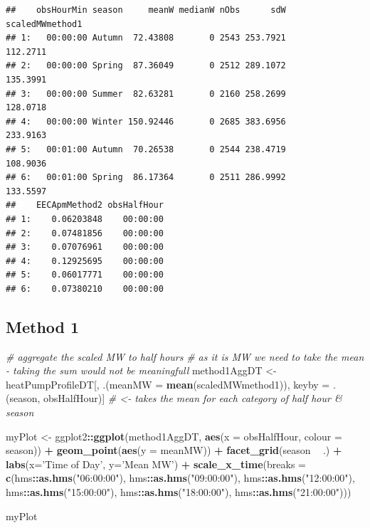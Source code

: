 \documentclass[]{article}
\newenvironment{Shaded}{\begin{snugshade}}{\end{snugshade}}
\newcommand{\KeywordTok}[1]{\textcolor[rgb]{0.13,0.29,0.53}{\textbf{#1}}}
\newcommand{\DataTypeTok}[1]{\textcolor[rgb]{0.13,0.29,0.53}{#1}}
\newcommand{\StringTok}[1]{\textcolor[rgb]{0.31,0.60,0.02}{#1}}
\newcommand{\CommentTok}[1]{\textcolor[rgb]{0.56,0.35,0.01}{\textit{#1}}}
\newcommand{\OperatorTok}[1]{\textcolor[rgb]{0.81,0.36,0.00}{\textbf{#1}}}
\newcommand{\NormalTok}[1]{#1}
\begin{document}
\begin{verbatim}
##    obsHourMin season     meanW medianW nObs      sdW scaledMWmethod1
## 1:   00:00:00 Autumn  72.43808       0 2543 253.7921        112.2711
## 2:   00:00:00 Spring  87.36049       0 2512 289.1072        135.3991
## 3:   00:00:00 Summer  82.63281       0 2160 258.2699        128.0718
## 4:   00:00:00 Winter 150.92446       0 2685 383.6956        233.9163
## 5:   00:01:00 Autumn  70.26538       0 2544 238.4719        108.9036
## 6:   00:01:00 Spring  86.17364       0 2511 286.9992        133.5597
##    EECApmMethod2 obsHalfHour
## 1:    0.06203848    00:00:00
## 2:    0.07481856    00:00:00
## 3:    0.07076961    00:00:00
## 4:    0.12925695    00:00:00
## 5:    0.06017771    00:00:00
## 6:    0.07380210    00:00:00
\end{verbatim}

\subsection{Method 1}\label{method-1}

\begin{Shaded}
\begin{Highlighting}[]
\CommentTok{# aggregate the scaled MW to half hours}
\CommentTok{# as it is MW we need to take the mean - taking the sum would not be meaningfull}
\NormalTok{method1AggDT <-}\StringTok{ }\NormalTok{heatPumpProfileDT[, .(}\DataTypeTok{meanMW =} \KeywordTok{mean}\NormalTok{(scaledMWmethod1)), }
\NormalTok{                                  keyby =}\StringTok{ }\NormalTok{.(season, obsHalfHour)] }\CommentTok{# <- takes the mean for each category of half hour & season}

\NormalTok{myPlot <-}\StringTok{ }\NormalTok{ggplot2}\OperatorTok{::}\KeywordTok{ggplot}\NormalTok{(method1AggDT, }\KeywordTok{aes}\NormalTok{(}\DataTypeTok{x =}\NormalTok{ obsHalfHour, }\DataTypeTok{colour =}\NormalTok{ season)) }\OperatorTok{+}
\StringTok{  }\KeywordTok{geom_point}\NormalTok{(}\KeywordTok{aes}\NormalTok{(}\DataTypeTok{y =}\NormalTok{ meanMW)) }\OperatorTok{+}
\StringTok{  }\KeywordTok{facet_grid}\NormalTok{(season }\OperatorTok{~}\StringTok{ }\NormalTok{.) }\OperatorTok{+}
\StringTok{  }\KeywordTok{labs}\NormalTok{(}\DataTypeTok{x=}\StringTok{'Time of Day'}\NormalTok{, }\DataTypeTok{y=}\StringTok{'Mean MW'}\NormalTok{) }\OperatorTok{+}
\StringTok{  }\KeywordTok{scale_x_time}\NormalTok{(}\DataTypeTok{breaks =} \KeywordTok{c}\NormalTok{(hms}\OperatorTok{::}\KeywordTok{as.hms}\NormalTok{(}\StringTok{"06:00:00"}\NormalTok{), hms}\OperatorTok{::}\KeywordTok{as.hms}\NormalTok{(}\StringTok{"09:00:00"}\NormalTok{), hms}\OperatorTok{::}\KeywordTok{as.hms}\NormalTok{(}\StringTok{"12:00:00"}\NormalTok{), }
\NormalTok{                          hms}\OperatorTok{::}\KeywordTok{as.hms}\NormalTok{(}\StringTok{"15:00:00"}\NormalTok{), hms}\OperatorTok{::}\KeywordTok{as.hms}\NormalTok{(}\StringTok{"18:00:00"}\NormalTok{), hms}\OperatorTok{::}\KeywordTok{as.hms}\NormalTok{(}\StringTok{"21:00:00"}\NormalTok{)))}

\NormalTok{myPlot}
\end{Highlighting}
\end{Shaded}
\end{document}
